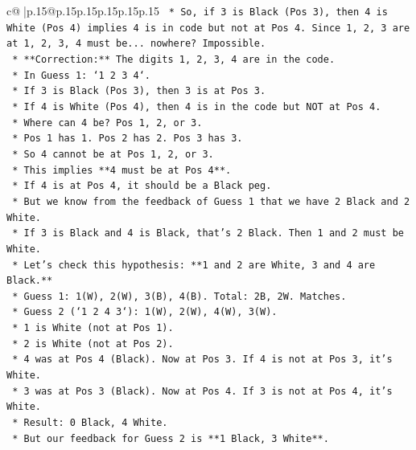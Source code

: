 \documentclass{article}
\begin{document}
{\begin{supertabular}{c@{$\;$}|p{.15\linewidth}@{}p{.15\linewidth}p{.15\linewidth}p{.15\linewidth}p{.15\linewidth}p{.15\linewidth}}
{{{\texttt{                *   So, if 3 is Black (Pos 3), then 4 is White (Pos 4) implies 4 is in code but not at Pos 4. Since 1, 2, 3 are at 1, 2, 3, 4 must be... nowhere? Impossible.} \\
\texttt{                *   **Correction:** The digits 1, 2, 3, 4 are in the code.} \\
\texttt{                *   In Guess 1: `1 2 3 4`.} \\
\texttt{                *   If 3 is Black (Pos 3), then 3 is at Pos 3.} \\
\texttt{                *   If 4 is White (Pos 4), then 4 is in the code but NOT at Pos 4.} \\
\texttt{                *   Where can 4 be? Pos 1, 2, or 3.} \\
\texttt{                *   Pos 1 has 1. Pos 2 has 2. Pos 3 has 3.} \\
\texttt{                *   So 4 cannot be at Pos 1, 2, or 3.} \\
\texttt{                *   This implies **4 must be at Pos 4**.} \\
\texttt{                *   If 4 is at Pos 4, it should be a Black peg.} \\
\texttt{                *   But we know from the feedback of Guess 1 that we have 2 Black and 2 White.} \\
\texttt{                *   If 3 is Black and 4 is Black, that's 2 Black. Then 1 and 2 must be White.} \\
\texttt{                *   Let's check this hypothesis: **1 and 2 are White, 3 and 4 are Black.**} \\
\texttt{                    *   Guess 1: 1(W), 2(W), 3(B), 4(B). Total: 2B, 2W. Matches.} \\
\texttt{                    *   Guess 2 (`1 2 4 3`): 1(W), 2(W), 4(W), 3(W).} \\
\texttt{                        *   1 is White (not at Pos 1).} \\
\texttt{                        *   2 is White (not at Pos 2).} \\
\texttt{                        *   4 was at Pos 4 (Black). Now at Pos 3. If 4 is not at Pos 3, it's White.} \\
\texttt{                        *   3 was at Pos 3 (Black). Now at Pos 4. If 3 is not at Pos 4, it's White.} \\
\texttt{                        *   Result: 0 Black, 4 White.} \\
\texttt{                    *   But our feedback for Guess 2 is **1 Black, 3 White**.} \\
}}}
\end{supertabular}}
\end{document}
